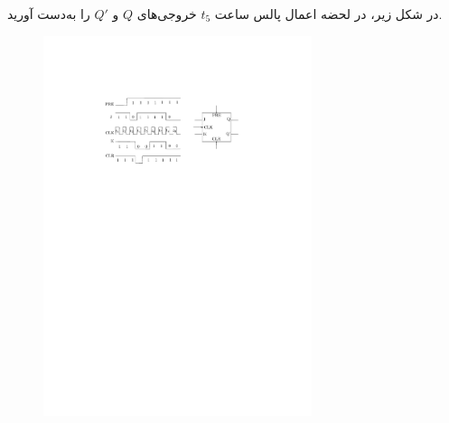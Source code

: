 
در شکل زیر، در لحضه اعمال پالس ساعت $t_5 $ خروجی‌های $Q$ و $Q'$ را به‌دست آورید.

\begin{figure}[h]
	\centering
	\includegraphics[width=0.7\textwidth]{fig/Q_basic6.pdf}
	\label{fig:Q_basic_6}
\end{figure}